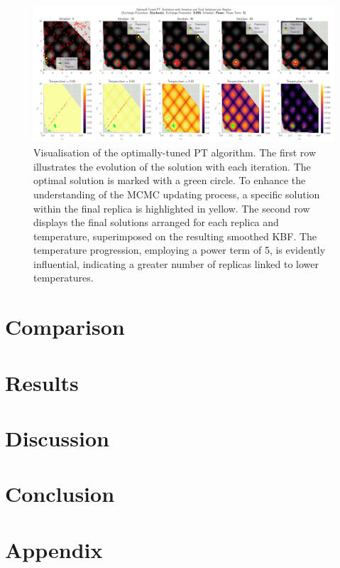 \documentclass[10pt]{article}
\begin{document}
\begin{figure}[H]
    \centering
    \includegraphics[width=1.1\textwidth]{../figures/Permanent Images/PT_Optimal_Tuning.png}
    \captionsetup{justification=centering}
    \caption{Visualisation of the optimally-tuned PT algorithm. The first row illustrates the evolution of the solution with each iteration. The optimal solution is marked with a green circle. To enhance the understanding of the MCMC updating process, a specific solution within the final replica is highlighted in yellow. The second row displays the final solutions arranged for each replica and temperature, superimposed on the resulting smoothed KBF. The temperature progression, employing a power term of 5, is evidently influential, indicating a greater number of replicas linked to lower temperatures.}
    \label{fig:PToptimal_evo}
\end{figure}

\section{Comparison}
\label{sec:CGA_QEG_comparison}
\section{Results}
\section{Discussion}
\section{Conclusion}

\newpage
\section{Appendix}
\end{document}
